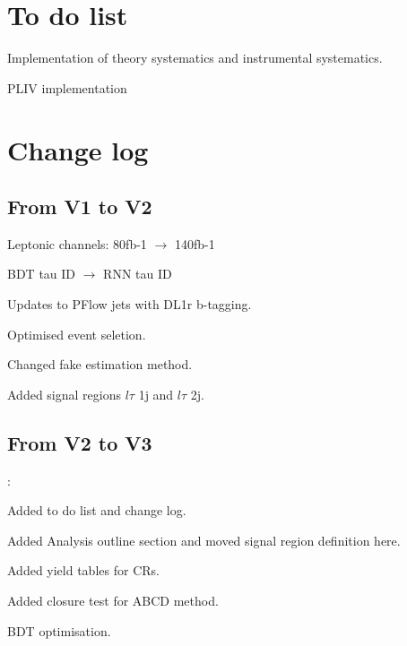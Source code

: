 \section{To do list}

Implementation of theory systematics and instrumental systematics.

PLIV implementation

\section{Change log}

\subsection{From V1 to V2}

Leptonic channels:  80fb-1 $\to$ 140fb-1

BDT tau ID $\to$ RNN tau ID

Updates to PFlow jets with DL1r b-tagging.

Optimised event seletion.

Changed fake estimation method.

Added signal regions $l\tau$ 1j and $l\tau$ 2j.

\subsection{From V2 to V3}:

Added to do list and change log.

Added Analysis outline section and moved signal region definition here.

Added yield tables for CRs.

Added closure test for ABCD method.

BDT optimisation.